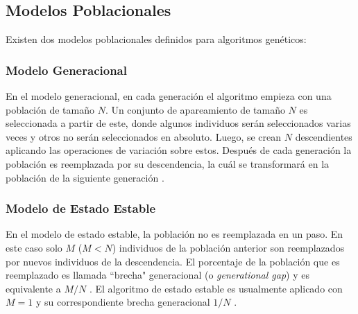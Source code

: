 \subsection{Modelos Poblacionales}
Existen dos modelos poblacionales definidos para algoritmos genéticos:

\subsubsection{Modelo Generacional}
En el modelo generacional, en cada generación el algoritmo empieza con una población de tamaño $N$. Un conjunto de apareamiento de tamaño $N$ es seleccionada a partir de este, donde algunos individuos serán seleccionados varias veces y otros no serán seleccionados en absoluto. Luego, se crean $N$ descendientes aplicando las operaciones de variación sobre estos. Después de cada generación la población es reemplazada por su descendencia, la cuál se transformará en la población de la siguiente generación \cite{grosan2011intelligent}.

\subsubsection{Modelo de Estado Estable}
En el modelo de estado estable, la población no es reemplazada en un paso. En este caso solo $M$ ($M<N$) individuos de la población anterior son reemplazados por nuevos individuos de la descendencia. El porcentaje de la población que es reemplazado es llamada ``brecha" generacional (o \emph{generational gap}) y es equivalente a $M/N$ \cite{grosan2011intelligent}. El algoritmo de estado estable es usualmente aplicado con $M=1$ y su correspondiente brecha generacional $1/N$ \cite{eiben2003introduction}.

